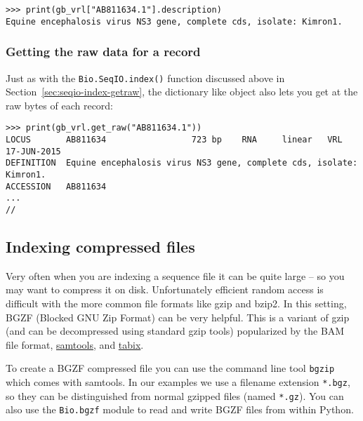 \begin{verbatim}
>>> print(gb_vrl["AB811634.1"].description)
Equine encephalosis virus NS3 gene, complete cds, isolate: Kimron1.
\end{verbatim}

\subsubsection{Getting the raw data for a record}

Just as with the \verb|Bio.SeqIO.index()| function discussed above in
Section~\ref{sec:seqio-index-getraw}, the dictionary like object also lets you
get at the raw bytes of each record:

%
\begin{verbatim}
>>> print(gb_vrl.get_raw("AB811634.1"))
LOCUS       AB811634                 723 bp    RNA     linear   VRL 17-JUN-2015
DEFINITION  Equine encephalosis virus NS3 gene, complete cds, isolate: Kimron1.
ACCESSION   AB811634
...
//
\end{verbatim}

\subsection{Indexing compressed files}
\label{sec:SeqIO-index-bgzf}

Very often when you are indexing a sequence file it can be quite large -- so
you may want to compress it on disk. Unfortunately efficient random access
is difficult with the more common file formats like gzip and bzip2. In this
setting, BGZF (Blocked GNU Zip Format) can be very helpful. This is a variant
of gzip (and can be decompressed using standard gzip tools) popularized by
the BAM file format, \href{https://www.htslib.org/}{samtools}, and
\href{https://www.htslib.org/doc/tabix.html}{tabix}.

To create a BGZF compressed file you can use the command line tool \verb|bgzip|
which comes with samtools. In our examples we use a filename extension
\verb|*.bgz|, so they can be distinguished from normal gzipped files (named
\verb|*.gz|). You can also use the \verb|Bio.bgzf| module to read and write
BGZF files from within Python.

